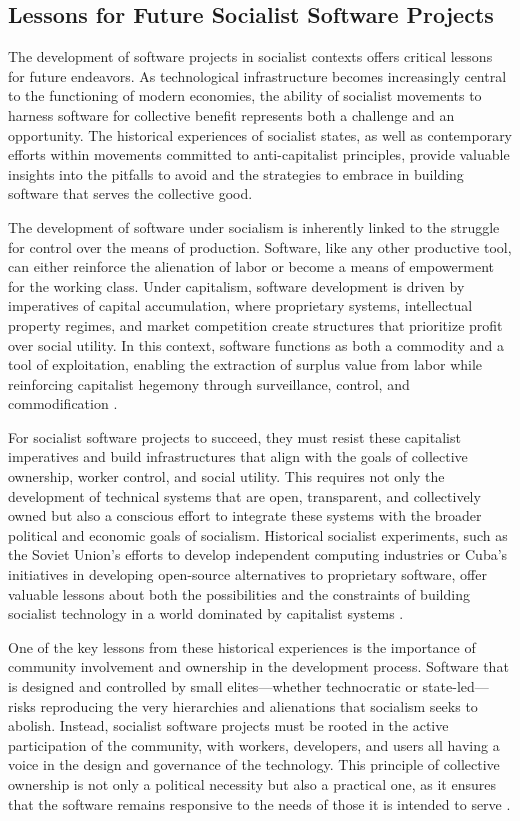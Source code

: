 \begin{refsection}
\section{Lessons for Future Socialist Software Projects}

The development of software projects in socialist contexts offers critical lessons for future endeavors. As technological infrastructure becomes increasingly central to the functioning of modern economies, the ability of socialist movements to harness software for collective benefit represents both a challenge and an opportunity. The historical experiences of socialist states, as well as contemporary efforts within movements committed to anti-capitalist principles, provide valuable insights into the pitfalls to avoid and the strategies to embrace in building software that serves the collective good.

The development of software under socialism is inherently linked to the struggle for control over the means of production. Software, like any other productive tool, can either reinforce the alienation of labor or become a means of empowerment for the working class. Under capitalism, software development is driven by imperatives of capital accumulation, where proprietary systems, intellectual property regimes, and market competition create structures that prioritize profit over social utility. In this context, software functions as both a commodity and a tool of exploitation, enabling the extraction of surplus value from labor while reinforcing capitalist hegemony through surveillance, control, and commodification \cite[pp.~127-130]{braverman1974}.

For socialist software projects to succeed, they must resist these capitalist imperatives and build infrastructures that align with the goals of collective ownership, worker control, and social utility. This requires not only the development of technical systems that are open, transparent, and collectively owned but also a conscious effort to integrate these systems with the broader political and economic goals of socialism. Historical socialist experiments, such as the Soviet Union’s efforts to develop independent computing industries or Cuba’s initiatives in developing open-source alternatives to proprietary software, offer valuable lessons about both the possibilities and the constraints of building socialist technology in a world dominated by capitalist systems \cite[pp.~202-205]{nove1991}.

One of the key lessons from these historical experiences is the importance of community involvement and ownership in the development process. Software that is designed and controlled by small elites—whether technocratic or state-led—risks reproducing the very hierarchies and alienations that socialism seeks to abolish. Instead, socialist software projects must be rooted in the active participation of the community, with workers, developers, and users all having a voice in the design and governance of the technology. This principle of collective ownership is not only a political necessity but also a practical one, as it ensures that the software remains responsive to the needs of those it is intended to serve \cite[pp.~105-108]{ernesto1968}.


\end{refsection}

